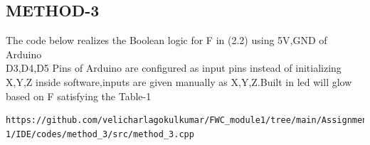 \documentclass[10pt, a4paper]{article}
\begin{document}
\subsection{METHOD-3}
The code below realizes the Boolean logic for F in (2.2)  using 5V,GND of Arduino
\\
D3,D4,D5 Pins of Arduino are configured as input pins instead of initializing X,Y,Z inside software,inputs are given manually as X,Y,Z.Built in led will glow based on F satisfying the Table-1
\begin{lstlisting}
https://github.com/velicharlagokulkumar/FWC_module1/tree/main/Assignment-1/IDE/codes/method_3/src/method_3.cpp
\end{lstlisting}

\end{document}

